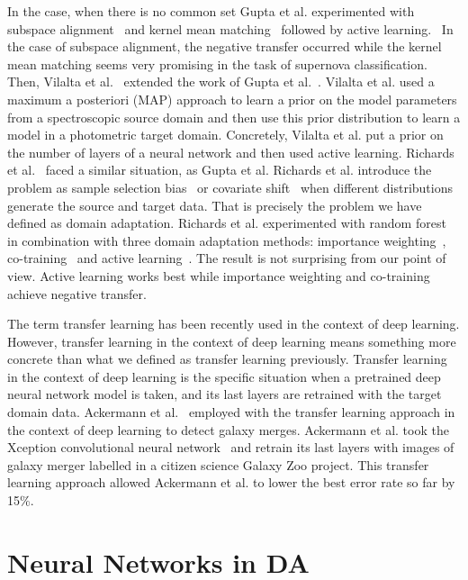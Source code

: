 In the case, when there is no common set Gupta et al. experimented with subspace alignment~\cite{fernando2014} and kernel mean matching~\cite{gretton2009} followed by active learning.~\cite{gupta2016}
In the case of subspace alignment, the negative transfer occurred while the kernel mean matching seems very promising in the task of supernova classification.
Then, Vilalta et al.~\cite{vilalta2018} extended the work of Gupta et al.~\cite{gupta2016}.
Vilalta et al. used a maximum a posteriori (MAP) approach to learn a prior on the model parameters from a spectroscopic source domain
and then use this prior distribution to learn a model in a photometric target domain.
Concretely, Vilalta et al. put a prior on the number of layers of a neural network
and then used active learning.
Richards et al.~\cite{richards2011} faced a similar situation, as Gupta et al.
Richards et al. introduce the problem as sample selection bias~\cite{shimodaira2000} or covariate shift~\cite{heckman1979}
when different distributions generate the source and target data.
That is precisely the problem we have defined as domain adaptation.
Richards et al. experimented with random forest in combination with three domain adaptation methods:
importance weighting~\cite{shimodaira2000}, co-training~\cite{blum1998} and active learning~\cite{settles2009}.
The result is not surprising from our point of view.
Active learning works best while importance weighting and co-training achieve negative transfer.

The term transfer learning has been recently used in the context of deep learning.
However, transfer learning in the context of deep learning means something more concrete than what we defined as transfer learning previously.
Transfer learning in the context of deep learning is the specific situation
when a pretrained deep neural network model is taken,
and its last layers are retrained with the target domain data.
Ackermann et al.~\cite{ackermann2018} employed with the transfer learning approach in the context of deep learning to detect galaxy merges.
Ackermann et al. took the Xception convolutional neural network~\cite{chollet2017}
and retrain its last layers with images of galaxy merger labelled in a citizen science Galaxy Zoo project.
This transfer learning approach allowed Ackermann et al. to lower the best error rate so far by 15\%.

\section{Neural Networks in DA}

